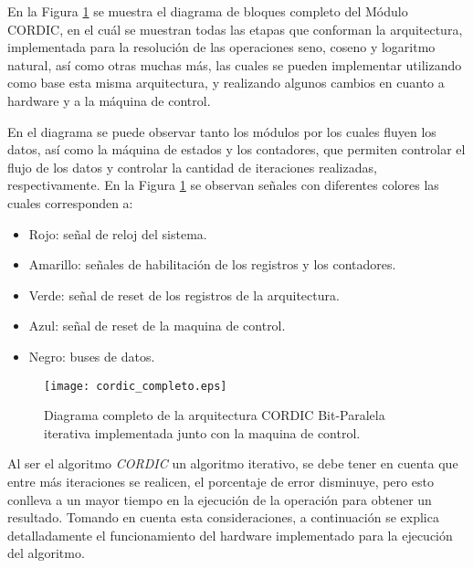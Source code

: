 En la Figura \ref{fig:Cordic_Arch_completa} se muestra el diagrama de bloques completo del Módulo CORDIC, en el cuál se muestran todas las etapas que conforman la arquitectura, implementada para la resolución de las operaciones seno, coseno y logaritmo natural, así como otras muchas más, las cuales se pueden implementar utilizando como base esta misma arquitectura, y realizando algunos cambios en cuanto a hardware y a la máquina de control.

En el diagrama se puede observar tanto los módulos por los cuales fluyen los datos, así como la máquina de estados y los contadores, que permiten controlar el flujo de los datos y controlar la cantidad de iteraciones realizadas, respectivamente. En la Figura \ref{fig:Cordic_Arch_completa} se observan señales con diferentes colores las cuales corresponden a:

\begin{itemize}
\item	Rojo: señal de reloj del sistema.
\item	Amarillo: señales de habilitación de los registros y los contadores.
\item	Verde: señal de reset de los registros de la arquitectura.
\item	Azul: señal de reset de la maquina de control.
\item	Negro: buses de datos.
\end{itemize}

\begin{figure}[H]
  \centering
  \texttt{[image: cordic\_completo.eps]}
  \caption{Diagrama completo de la arquitectura CORDIC Bit-Paralela iterativa implementada junto con la maquina de control.}
  \label{fig:Cordic_Arch_completa}
\end{figure}


\newpage

Al ser el algoritmo \textit{CORDIC} un algoritmo iterativo, se debe tener en cuenta que entre más iteraciones se realicen, el porcentaje de error disminuye, pero esto conlleva a un mayor tiempo en la ejecución de la operación para obtener un resultado. Tomando en cuenta esta consideraciones, a continuación se explica detalladamente el funcionamiento del hardware implementado para la ejecución del algoritmo.

